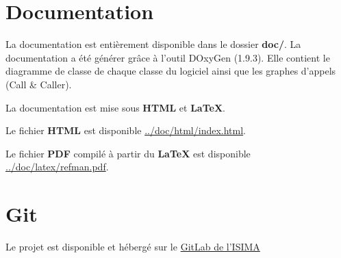 \documentclass[11pt]{article}
\begin{document}
\section{Documentation\label{orgd9ec182}}
\label{sec:orgc34c963}

La documentation est entièrement disponible dans le dossier \textbf{doc/}. La
documentation a été générer grâce à l'outil DOxyGen (1.9.3). Elle contient le
diagramme de classe de chaque classe du logiciel ainsi que les graphes
d'appels (Call \& Caller). 

La documentation est mise sous \textbf{HTML} et \textbf{\LaTeX{}}.

Le fichier \textbf{HTML} est disponible \href{/home/hozen/cur/projet-java/doc/html/index.html}{../doc/html/index.html}.

Le fichier \textbf{PDF} compilé à partir du \textbf{\LaTeX{}} est disponible
\href{/home/hozen/cur/projet-java/doc/latex/refman.pdf}{../doc/latex/refman.pdf}.

\section{Git\label{org1c20dca}}
\label{sec:orgad5cd5c}

Le projet est disponible et hébergé sur le \href{https://gitlab.isima.fr/endurel/projet-java}{GitLab de l'ISIMA}

\newpage
\listoffigures
\end{document}
